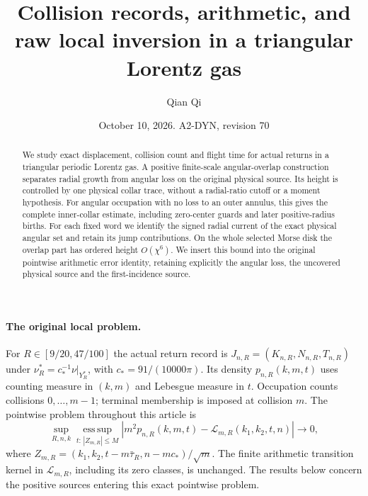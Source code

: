\documentclass[11pt,reqno]{amsart}
\title[Collision records and raw local inversion]{Collision records, arithmetic, and raw local inversion in a triangular Lorentz gas}
\author{Qian Qi}
\date{October 10, 2026. A2-DYN, revision 70}
\numberwithin{equation}{section}
\theoremstyle{definition}\newtheorem{definition}[theorem]{Definition}
\theoremstyle{remark}\newtheorem{remark}[theorem]{Remark}
\begin{document}
\raggedbottom
\begin{abstract}
We study exact displacement, collision count and flight time for
actual returns in a triangular periodic Lorentz gas. A positive
finite-scale angular-overlap construction separates radial growth
from angular loss on the original physical source. Its height is
controlled by one physical collar trace, without a radial-ratio
cutoff or a moment hypothesis. For angular occupation with no loss
to an outer annulus, this gives the complete inner-collar estimate,
including zero-center guards and later positive-radius births.
For each fixed word we identify the signed radial current of the
exact physical angular set and retain its jump contributions.
On the whole selected Morse disk the overlap part has ordered
height $O(\chi^6)$. We insert this bound into the original pointwise
arithmetic error identity, retaining explicitly the angular loss,
the uncovered physical source and the first-incidence source.
\end{abstract}
\maketitle

\paragraph{The original local problem.}
For $R\in[9/20,47/100]$ the actual return record is
$J_{n,R}=(K_{n,R},N_{n,R},T_{n,R})$ under
$\nu_R^*=c_*^{-1}\nu|_{Y_R^*}$, with $c_*=91/(10000\pi)$.
Its density $p_{n,R}(k,m,t)$ uses counting measure in $(k,m)$
and Lebesgue measure in $t$. Occupation counts collisions
$0,\ldots,m-1$; terminal membership is imposed at collision $m$.
The pointwise problem throughout this article is
\begin{equation}\label{eq:intro-v70-pointwise-target}
 \sup_{R,n,k}\operatorname*{ess\,sup}_{t:\,|Z_{m,R}|\le M}
 \left|m^2p_{n,R}(k,m,t)-\mathcal L_{m,R}(k_1,k_2,t,n)\right|
 \longrightarrow0,
\end{equation}
where $Z_{m,R}=(k_1,k_2,t-m\bar\tau_R,n-mc_*)/\sqrt m$.
The finite arithmetic transition kernel in $\mathcal L_{m,R}$,
including its zero classes, is unchanged. The results below concern
the positive sources entering this exact pointwise problem.
\end{document}
